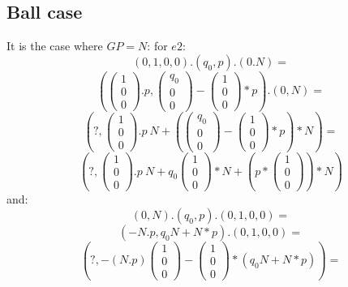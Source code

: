 \subsection{Ball case}
It is the case where $GP=N$:
for $e2$:
\[(0,1,0,0).(q_0,p).(0.N)=\]
\[\left(\left(\begin{array}{c}1\\0\\0\end{array}\right).p,\left(\begin{array}{c}q_0\\0\\0\end{array}\right) -\left(\begin{array}{c}1\\0\\0\end{array}\right)*p \right).(0,N)=\]
\[\left(?, \left(\begin{array}{c}1\\0\\0\end{array}\right).p~N+\left(\left(\begin{array}{c}q_0\\0\\0\end{array}\right)- \left(\begin{array}{c}1\\0\\0\end{array}\right)*p \right)*N\right)=\]
\[\left(?, \left(\begin{array}{c}1\\0\\0\end{array}\right).p~N+q_0 \left(\begin{array}{c}1\\0\\0\end{array}\right)*N+ \left(p* \left(\begin{array}{c}1\\0\\0\end{array}\right)\right)*N \right)\]
and:
\[(0,N).(q_0,p).(0,1,0,0)=\]
\[(-N.p,q_0N+N*p).(0,1,0,0)=\]
\[\left(?,-(N.p)\left(\begin{array}{c}1\\0\\0\end{array}\right) - \left(\begin{array}{c}1\\0\\0\end{array}\right)*(q_0N+N*p)\right)=\]
